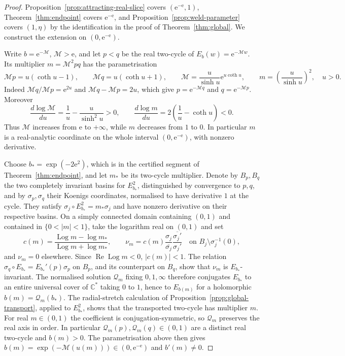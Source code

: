 \documentclass[11pt]{amsart}
\theoremstyle{definition}
\newcommand{\eee}{\mathrm{e}}
\begin{document}
\begin{proof}
Proposition~\ref{prop:attracting-real-slice} covers $(\eee^{-\eee},1)$,
Theorem~\ref{thm:endpoint} covers $\eee^{-\eee}$, and
Proposition~\ref{prop:weld-parameter} covers $(1,\eta)$ by the
identification in the proof of Theorem~\ref{thm:global}.  We construct
the extension on $(0,\eee^{-\eee})$.

Write $b=\eee^{-\mathcal M}$, $\mathcal M>\eee$, and let $p<q$ be the real two-cycle of
$E_b(w)=\eee^{-\mathcal Mw}$.  Its multiplier $m=\mathcal M^2pq$ has the parametrisation
\[
 \mathcal Mp=u(\coth u-1),\qquad \mathcal Mq=u(\coth u+1),\qquad
 \mathcal M=\frac{u}{\sinh u}\eee^{u\coth u},\qquad
 m=\left(\frac{u}{\sinh u}\right)^2,\quad u>0.
\]
Indeed $\mathcal Mq/\mathcal Mp=\eee^{2u}$ and $\mathcal Mq-\mathcal Mp=2u$, which give
$p=\eee^{-\mathcal Mq}$ and $q=\eee^{-\mathcal Mp}$.  Moreover
\[
 \frac{d\log \mathcal M}{du}=\frac1u-\frac{u}{\sinh^2u}>0,
 \qquad \frac{d\log m}{du}=2\left(\frac1u-\coth u\right)<0.
\]
Thus $\mathcal M$ increases from $\eee$ to $+\infty$, while $m$ decreases from
$1$ to $0$.  In particular $m$ is a real-analytic coordinate on the
whole interval $(0,\eee^{-\eee})$, with nonzero derivative.

Choose $b_*=\exp(-2\eee^2)$, which is in the certified segment of
Theorem~\ref{thm:endpoint}, and let $m_*$ be its two-cycle multiplier.
Denote by $B_p,B_q$ the two completely invariant basins for $E_{b_*}^2$,
distinguished by convergence to $p,q$, and by $\sigma_p,\sigma_q$ their
Koenigs coordinates, normalised to have derivative $1$ at the cycle.
They satisfy $\sigma_j\circ E_{b_*}^2=m_*\sigma_j$ and have nonzero
derivative on their respective basins.  On a simply connected domain
containing $(0,1)$ and contained in $\{0<|m|<1\}$, take the logarithm
real on $(0,1)$ and set
\[
 c(m)=\frac{\operatorname{Log}m-\log m_*}
              {\operatorname{Log}m+\log m_*},\qquad
 \nu_m=c(m)\frac{\sigma_j}{\overline{\sigma_j}}
                 \frac{\overline{\sigma_j'}}{\sigma_j'}
       \quad\text{on }B_j\setminus\sigma_j^{-1}(0),
\]
and $\nu_m=0$ elsewhere.  Since $\operatorname{Re}\operatorname{Log}m<0$,
$|c(m)|<1$.  The relation $\sigma_q\circ E_{b_*}=E_{b_*}'(p)\sigma_p$
on $B_p$, and its counterpart on $B_q$, show that $\nu_m$ is
$E_{b_*}$-invariant.  The normalised solution $\mathcal Q_m$ fixing $0,1,\infty$
therefore conjugates $E_{b_*}$ to an entire universal cover of
$\mathbb C^*$ taking $0$ to $1$, hence to $E_{b(m)}$ for a holomorphic
$b(m)=\mathcal Q_m(b_*)$.  The radial-stretch calculation of
Proposition~\ref{prop:global-transport}, applied to $E_{b_*}^2$,
shows that the transported two-cycle has multiplier $m$.
For real $m\in(0,1)$ the coefficient is conjugation-symmetric, so
$\mathcal Q_m$ preserves the real axis in order.  In particular
$\mathcal Q_m(p),\mathcal Q_m(q)\in(0,1)$ are a distinct real two-cycle and $b(m)>0$.
The parametrisation above
then gives $b(m)=\exp(-\mathcal M(u(m)))\in(0,\eee^{-\eee})$ and
$b'(m)\ne0$.


\end{proof}
\end{document}
